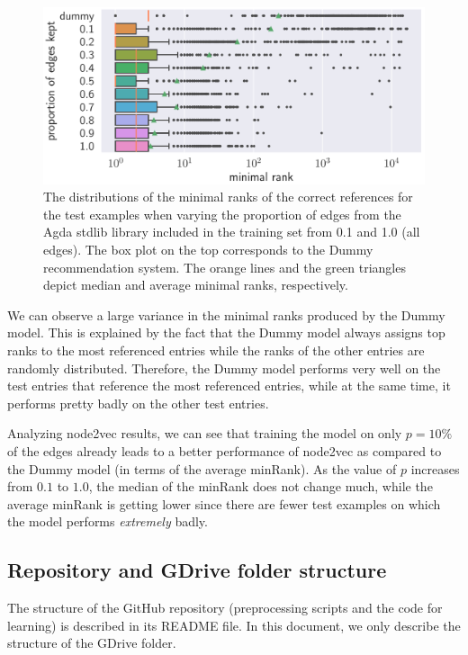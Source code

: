 \documentclass{article}
\begin{document}
\begin{figure}
    \centering
    \includegraphics[width=\textwidth]{boxplots.pdf}
    \caption{The distributions of the minimal ranks of the correct references for the test examples when varying the proportion of edges from the Agda stdlib library included in the training set from 0.1 and 1.0 (all edges). The box plot on the top corresponds to the Dummy recommendation system. The orange lines and the green triangles depict median and average minimal ranks, respectively.}
    \label{fig:boxplots}
\end{figure}
We can observe a large variance in the minimal ranks produced by the Dummy model. This is explained by the fact that the Dummy model always assigns top ranks to the most referenced entries while the ranks of the other entries are randomly distributed. Therefore, the Dummy model performs very well on the test entries that reference the most referenced entries, while at the same time, it performs pretty badly on the other test entries.

Analyzing node2vec results, we can see that training the model on only $p = 10\%$ of the edges already leads to a better performance of node2vec as compared to the Dummy model (in terms of the average minRank). As the value of $p$ increases from $0.1$ to $1.0$, the median of the minRank does not change much, while the average minRank is getting lower since there are fewer test examples on which the model performs \emph{extremely} badly.
\color{black}


\subsection{Repository and GDrive folder structure}
The structure of the GitHub repository (preprocessing scripts and the code for learning) is described in its README file. In this document, we only describe the structure of the GDrive folder.
\end{document}
